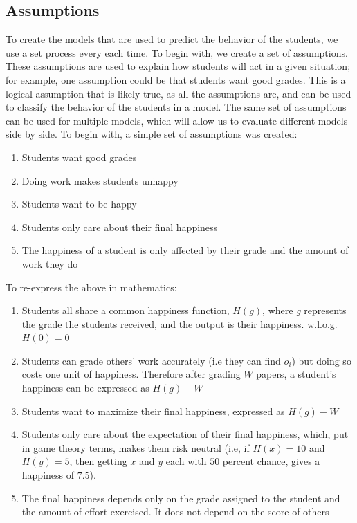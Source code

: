 \documentclass[12pt, Arial]{article}
\begin{document}
\subsection{Assumptions}
To create the models that are used to predict the behavior of the students, we use a set process every each time. To begin with, we create a set of assumptions. These assumptions are used to explain how students will act in a given situation; for example, one assumption could be that students want good grades. This is a logical assumption that is likely true, as all the assumptions are, and can be used to classify the behavior of the students in a model. The same set of assumptions can be used for multiple models, which will allow us to evaluate different models side by side. To begin with, a simple set of assumptions was created:
\begin{enumerate}[itemsep=0pt, parsep=0pt]
	\item Students want good grades
 	\item Doing work makes students unhappy
  	\item Students want to be happy
 	\item Students only care about their final happiness
  	\item The happiness of a student is only affected by their grade and the amount of work they do
\end{enumerate}
To re-express the above in mathematics:
\begin{enumerate}
  \item Students all share a common happiness function, $H(g)$, where \emph{g} represents the grade the students received, and the output is their happiness. w.l.o.g. $H(0)=0$
  \item Students can grade others' work accurately (i.e they can find $o_i$) but doing so costs one unit of happiness. Therefore after grading $W$ papers, a student's happiness can be expressed as $H(g)-W$
  \item Students want to maximize their final happiness, expressed as $H(g)-W$
  \item Students only care about the expectation of their final happiness, which, put in game theory terms, makes them risk neutral (i.e, if $H(x)=10$ and $H(y)=5$, then getting $x$ and $y$ each with $50$ percent chance, gives a happiness of $7.5$).
  \item The final happiness depends only on the grade assigned to the student and the amount of effort exercised. It does not depend on the score of others
\end{enumerate}
\end{document}

